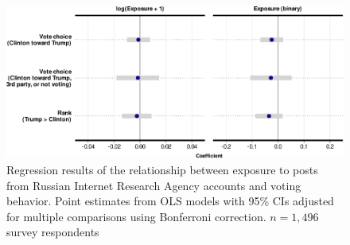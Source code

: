 \documentclass[
  12pt,
]{article}
\begin{document}
\begin{figure}
\centering
\includegraphics{Supplementary_Information_files/figure-latex/Supplementary-Figure-G14-1.pdf}
\caption{\label{fig:Supplementary-Figure-G14}Regression results of the relationship between exposure to posts from Russian Internet Research Agency accounts and voting behavior. Point estimates from OLS models with 95\% CIs adjusted for multiple comparisons using Bonferroni correction. \(n = 1,496\) survey respondents}
\end{figure}

\clearpage

\renewcommand\refname{Supplementary References}
  
\end{document}
